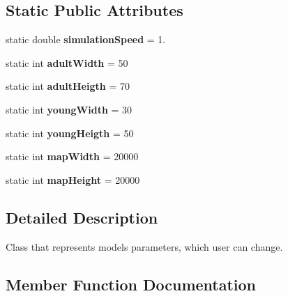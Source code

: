 \subsection*{Static Public Attributes}
\begin{DoxyCompactItemize}
\item 
\hypertarget{class_parameters_ac42d2e7c0e70f4c9def9395b437d7fe3}{}static double {\bfseries simulation\+Speed} = 1.\label{class_parameters_ac42d2e7c0e70f4c9def9395b437d7fe3}

\item 
\hypertarget{class_parameters_a9e8b2f3ffa5097236e933baa457d925c}{}static int {\bfseries adult\+Width} = 50\label{class_parameters_a9e8b2f3ffa5097236e933baa457d925c}

\item 
\hypertarget{class_parameters_a96a472acc0bea5e085e539bc37887e7d}{}static int {\bfseries adult\+Heigth} = 70\label{class_parameters_a96a472acc0bea5e085e539bc37887e7d}

\item 
\hypertarget{class_parameters_a738bb8522f1b522d88381f468f908053}{}static int {\bfseries young\+Width} = 30\label{class_parameters_a738bb8522f1b522d88381f468f908053}

\item 
\hypertarget{class_parameters_a8134022f027e5bce2e4595c29e7daabc}{}static int {\bfseries young\+Heigth} = 50\label{class_parameters_a8134022f027e5bce2e4595c29e7daabc}

\item 
\hypertarget{class_parameters_aa18640156cfa58c00dea2dcadb17efc8}{}static int {\bfseries map\+Width} = 20000\label{class_parameters_aa18640156cfa58c00dea2dcadb17efc8}

\item 
\hypertarget{class_parameters_a819544c29d5c205ae99b3973e0b30a9c}{}static int {\bfseries map\+Height} = 20000\label{class_parameters_a819544c29d5c205ae99b3973e0b30a9c}

\end{DoxyCompactItemize}


\subsection{Detailed Description}
Class that represents models parameters, which user can change. 

\subsection{Member Function Documentation}
\hypertarget{class_parameters_a6d84a2dc3c36144dc054a8516fce43cc}{}
